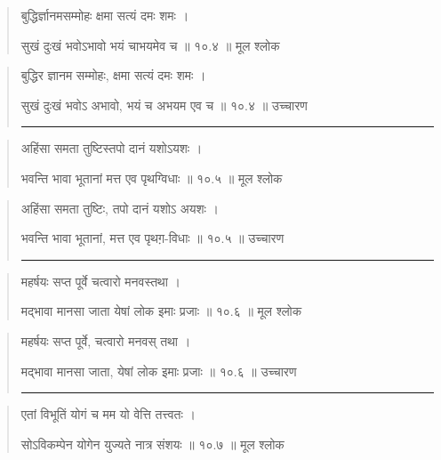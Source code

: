 \begin{quotation} 

बुद्धिर्ज्ञानमसम्मोहः क्षमा सत्यं दमः शमः  ।  

सुखं दुःखं भवोऽभावो भयं चाभयमेव च  ॥ १०.४ ॥  मूल श्लोक
\end{quotation}

\begin{quotation}

बुद्धिर ज्ञानम सम्मोहः, क्षमा सत्यं दमः शमः  ।  

सुखं दुःखं भवोऽ अभावो, भयं च अभयम एव च  ॥ १०.४ ॥  उच्चारण

\noindent\rule{16cm}{0.4pt} 
\end{quotation}


\begin{quotation} 

अहिंसा समता तुष्टिस्तपो दानं यशोऽयशः  ।  

भवन्ति भावा भूतानां मत्त एव पृथग्विधाः  ॥ १०.५ ॥  मूल श्लोक
\end{quotation}

\begin{quotation}

अहिंसा समता तुष्टिः, तपो दानं यशोऽ अयशः  ।  

भवन्ति भावा भूतानां, मत्त एव पृथग़-विधाः  ॥ १०.५ ॥  उच्चारण

\noindent\rule{16cm}{0.4pt} 
\end{quotation}


\begin{quotation} 

महर्षयः सप्त पूर्वे चत्वारो मनवस्तथा  ।  

मद्भावा मानसा जाता येषां लोक इमाः प्रजाः  ॥ १०.६ ॥  मूल श्लोक
\end{quotation}

\begin{quotation}

महर्षयः सप्त पूर्वे, चत्वारो मनवस् तथा  ।  

मद्भावा मानसा जाता, येषां लोक इमाः प्रजाः  ॥ १०.६ ॥  उच्चारण

\noindent\rule{16cm}{0.4pt} 
\end{quotation}


\begin{quotation} 

एतां विभूतिं योगं च मम यो वेत्ति तत्त्वतः ।  

सोऽविकम्पेन योगेन युज्यते नात्र संशयः  ॥ १०.७ ॥  मूल श्लोक
\end{quotation}

